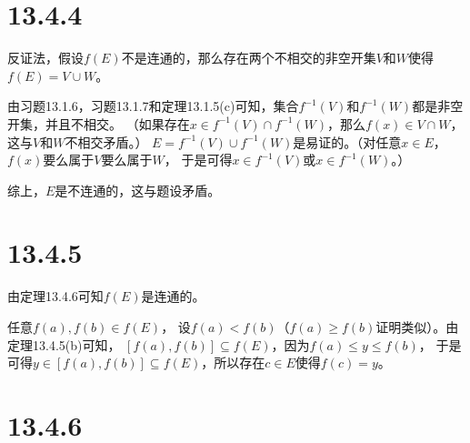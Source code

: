 \documentclass{article}
\begin{document}
\section*{13.4.4}

反证法，假设$f(E)$不是连通的，那么存在两个不相交的非空开集$V$和$W$使得$f(E) = V \cup W$。

由习题13.1.6，习题13.1.7和定理13.1.5(c)可知，集合$f^{-1}(V)$和$f^{-1}(W)$都是非空开集，并且不相交。
（如果存在$x \in f^{-1}(V) \cap f^{-1}(W)$，那么$f(x) \in V \cap W$，这与$V$和$W$不相交矛盾。）
$E = f^{-1}(V) \cup f^{-1}(W)$是易证的。（对任意$x \in E$，$f(x)$要么属于$V$要么属于$W$，
于是可得$x \in f^{-1}(V)$或$x \in f^{-1}(W)$。）

综上，$E$是不连通的，这与题设矛盾。

\section*{13.4.5}

由定理13.4.6可知$f(E)$是连通的。

任意$f(a), f(b) \in f(E)$，
设$f(a) < f(b)$（$f(a) \geq f(b)$证明类似）。由定理13.4.5(b)可知，
$[f(a), f(b)] \subseteq f(E)$，因为$f(a) \leq y \leq f(b)$，
于是可得$y \in [f(a), f(b)] \subseteq f(E)$，所以存在$c \in E$使得$f(c) = y$。

\section*{13.4.6}
\end{document}

